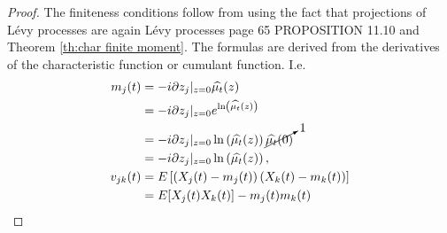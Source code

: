 \documentclass[a4paper,11pt]{article}
\begin{document}
\begin{proof}
    The finiteness conditions follow from using the fact that projections of Lévy processes are again Lévy processes \cite{sato_levy_2013} page 65 PROPOSITION 11.10 and Theorem \ref{th:char finite moment}. The formulas are derived
    from the derivatives of the characteristic function or cumulant function. I.e.
        { \small
            \begin{align}
                m_{j}(t)   & = -i \partial z_{j}|_{z=0} \widehat{\mu_{t}}(z)                                                                                                                                                                                                                                                                       \\
                           & = -i \partial z_{j}|_{z=0} e^{\ln \left(\widehat{\mu_{t}}(z)\right)}                                                                                                                                                                                                                                                  \\
                           & = -i \partial z_{j}|_{z=0}\ln \left(\widehat{\mu_{t}}(z)\right) \cancelto{1}{\widehat{\mu_{t}}(0)}                                                                                                                                                                                                                    \\
                           & = -i \partial z_{j}|_{z=0}\ln \left(\widehat{\mu_{t}}(z)\right),                                                                                                                                                                                                                                                      \\
                v_{j k}(t) & =E\left[\left(X_{j}(t)-m_{j}(t)\right)\left(X_{k}(t)-m_{k}(t)\right)\right]                                                                                                                                                                                                                                           \\
                           & = E[X_{j}(t)X_{k}(t)] - m_{j}(t)m_{k}(t)                                                                                                                                                                                                                                                                              \\

\end{align}}
\end{proof}
\end{document}
